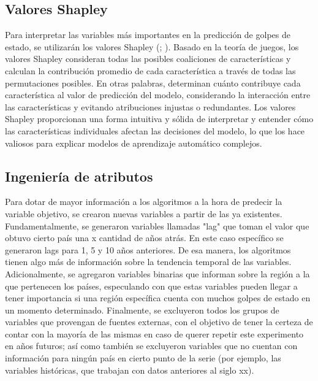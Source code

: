\documentclass{article}
\begin{document}
\subsection{Valores Shapley}
Para interpretar las variables más importantes en la predicción de golpes de estado, se 
utilizarán los valores Shapley (\cite{Str10}; \cite{Lun17}). Basado en la teoría de 
juegos, los valores Shapley  consideran todas las posibles coaliciones de características 
y calculan la contribución promedio de cada característica a través de todas las 
permutaciones posibles. En otras palabras, determinan cuánto contribuye cada 
característica al valor de predicción del modelo, considerando la interacción entre las 
características y evitando atribuciones injustas o redundantes. Los valores Shapley
proporcionan una forma intuitiva y sólida de interpretar y entender cómo las 
características individuales afectan las decisiones del modelo, lo que los hace valiosos 
para explicar modelos de aprendizaje automático complejos.

\subsection{Ingeniería de atributos}
Para dotar de mayor información a los algoritmos a la hora de predecir la variable
objetivo, se crearon nuevas variables a partir de las ya existentes. Fundamentalmente,
se generaron variables llamadas "lag" que toman el valor que obtuvo cierto país una x
cantidad de años atrás. En este caso específico se generaron lags para 1, 5 y 10 años 
anteriores. De esa manera, los algoritmos tienen algo más de información sobre la 
tendencia temporal de las variables. Adicionalmente, se agregaron variables binarias
que informan sobre la región a la que pertenecen los países, especulando con que estas
variables pueden llegar a tener importancia si una región específica cuenta con muchos
golpes de estado en un momento determinado. Finalmente, se excluyeron todos los grupos
de variables que provengan de fuentes externas, con el objetivo de tener la certeza de
contar con la mayoría de las mismas en caso de querer repetir este experimento en años 
futuros; así como también se excluyeron variables que no cuentan con información para 
ningún país en cierto punto de la serie (por ejemplo, las variables históricas, que 
trabajan con datos anteriores al siglo xx).
\end{document}
